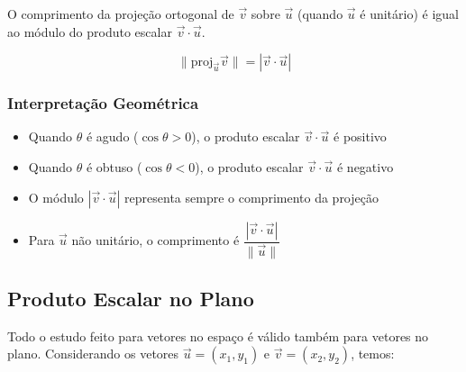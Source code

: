 O comprimento da projeção ortogonal de $\vec{v}$ sobre $\vec{u}$ (quando
$\vec{u}$ é unitário) é igual ao módulo do produto escalar $\vec{v} \cdot
\vec{u}$.

\[
\|\text{proj}_{\vec{u}} \vec{v}\| = |\vec{v} \cdot \vec{u}|
\]

\subsubsection*{Interpretação Geométrica}
\begin{itemize}
  \item Quando $\theta$ é agudo ($\cos\theta > 0$), o produto escalar $\vec{v} \cdot \vec{u}$ é positivo
  \item Quando $\theta$ é obtuso ($\cos\theta < 0$), o produto escalar $\vec{v} \cdot \vec{u}$ é negativo
  \item O módulo $|\vec{v} \cdot \vec{u}|$ representa sempre o comprimento da projeção
  \item Para $\vec{u}$ não unitário, o comprimento é $\dfrac{|\vec{v} \cdot \vec{u}|}{\|\vec{u}\|}$
\end{itemize}

\subsection{Produto Escalar no Plano}

Todo o estudo feito para vetores no espaço é válido também para vetores no
plano. Considerando os vetores $\vec{u} = (x_1, y_1)$ e $\vec{v} = (x_2, y_2)$,
temos:

